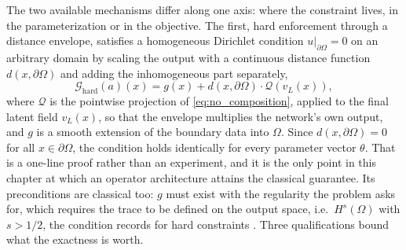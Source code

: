 The two available mechanisms differ along one axis: where the constraint lives, in the
parameterization or in the objective.
The first, hard enforcement through a distance envelope, satisfies a homogeneous Dirichlet condition
$u|_{\partial\Omega}=0$ on an arbitrary domain by scaling the output with a continuous distance
function $d(x,\partial\Omega)$ and adding the inhomogeneous part separately,
\begin{equation}
  \label{eq:ch37-hard}
  \mathcal{G}_{\text{hard}}(a)(x) = g(x) + d(x, \partial\Omega) \cdot \mathcal{Q}(v_L(x)),
\end{equation}
where $\mathcal{Q}$ is the pointwise projection of \eqref{eq:no_composition}, applied to the final
latent field $v_L(x)$, so that the envelope multiplies the network's own output, and $g$ is a smooth
extension of the boundary data into $\Omega$. Since
$d(x,\partial\Omega)=0$ for all $x\in\partial\Omega$, the condition holds identically for every
parameter vector $\theta$. That is a one-line proof rather than an experiment, and it is the only
point in this chapter at which an operator architecture attains the classical guarantee. Its
preconditions are classical too: $g$ must exist with the regularity the problem asks for, which
requires the trace to be defined on the output space, i.e.\ $H^{s}(\Omega)$ with $s>1/2$, the
condition  records for hard constraints
.
Three qualifications bound what the exactness is worth.

